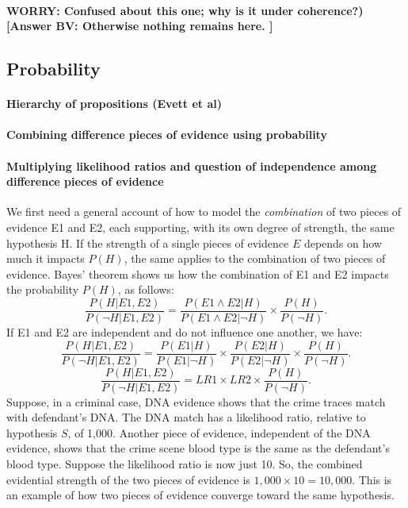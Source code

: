 \documentclass[10pt]{article}
\begin{document}
\paragraph{WORRY: Confused about this one; why is it under coherence?) [Answer BV: Otherwise nothing remains here. ]}

\subsection{Probability}


\paragraph{Hierarchy of propositions (Evett et al)}


\paragraph{Combining difference pieces of evidence using probability}


\paragraph{Multiplying likelihood ratios and question of independence among difference pieces of evidence}



We first need a general account of how to 
model the \textit{combination} of two pieces of evidence E1 and E2, each supporting, with its own degree of strength, the same hypothesis H. If the strength of a single pieces of evidence $E$ depends on how much it impacts $P(H)$, the same applies to the combination of two pieces of evidence. 
Bayes' theorem shows us how the combination of E1 and E2  impacts the probability $P(H)$, as follows:
%
\[\frac{P(H| E1, E2)}{P(\neg H| E1, E2)}=\frac{P(E1\wedge E2|H)}{P(E1\wedge E2|\neg H)}\times \frac{P(H)}{P(\neg H)}.\]
%
If E1 and E2 are independent and do not influence one another, we have:
%
\[\frac{P(H| E1, E2)}{P(\neg H| E1, E2)}=\frac{P(E1|H)}{P(E1|\neg H)}\times\frac{P(E2|H)}{P(E2|\neg H)}\times \frac{P(H)}{P(\neg H)}.\]
%
\[\frac{P(H| E1, E2)}{P(\neg H| E1, E2)}= LR1\times LR2 \times \frac{P(H)}{P(\neg H)}.\]
%
Suppose, in a criminal case, DNA evidence shows that the crime traces match with defendant's 
DNA. The DNA match has a likelihood ratio, relative to hypothesis $S$, of 1,000. Another piece of evidence, independent of the DNA evidence, shows that the crime scene blood type is the same as the defendant's blood type. Suppose the likelihood ratio is now just 10. 
So, the combined evidential strength of the two pieces 
of evidence is $1,000\times 10=10,000$. This is an example of how two pieces of evidence converge  toward the 
same hypothesis.
\end{document}
